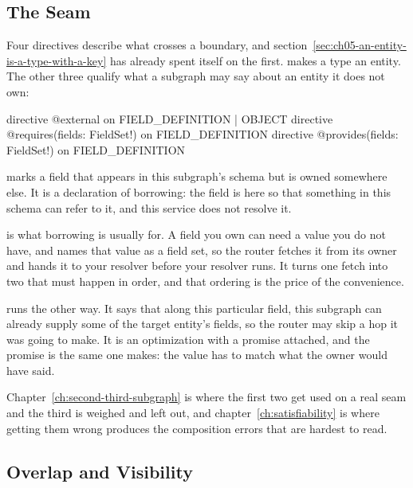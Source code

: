 \subsection{The Seam}

%
Four directives describe what crosses a boundary, and
section~\ref{sec:ch05-an-entity-is-a-type-with-a-key} has already spent itself
on the first.  makes a type an entity. The other three qualify what
a subgraph may say about an entity it does not own:

\begin{graphqlsdl}
directive @external on FIELD_DEFINITION | OBJECT
directive @requires(fields: FieldSet!) on FIELD_DEFINITION
directive @provides(fields: FieldSet!) on FIELD_DEFINITION
\end{graphqlsdl}

%
 marks a field that appears in this subgraph's schema but is
owned somewhere else. It is a declaration of borrowing: the field is here so
that something in this schema can refer to it, and this service does not
resolve it.

%
 is what borrowing is usually for. A field you own can need a
value you do not have, and  names that value as a field set, so
the router fetches it from its owner and hands it to your resolver before your
resolver runs. It turns one fetch into two that must happen in order, and that
ordering is the price of the convenience.

%
 runs the other way. It says that along this particular field,
this subgraph can already supply some of the target entity's fields, so the
router may skip a hop it was going to make. It is an optimization with a
promise attached, and the promise is the same one  makes: the
value has to match what the owner would have said.

Chapter~\ref{ch:second-third-subgraph} is where the first two get used on a
real seam and the third is weighed and left out, and
chapter~\ref{ch:satisfiability} is where getting them wrong produces
the composition errors that are hardest to read.

\subsection{Overlap and Visibility}

